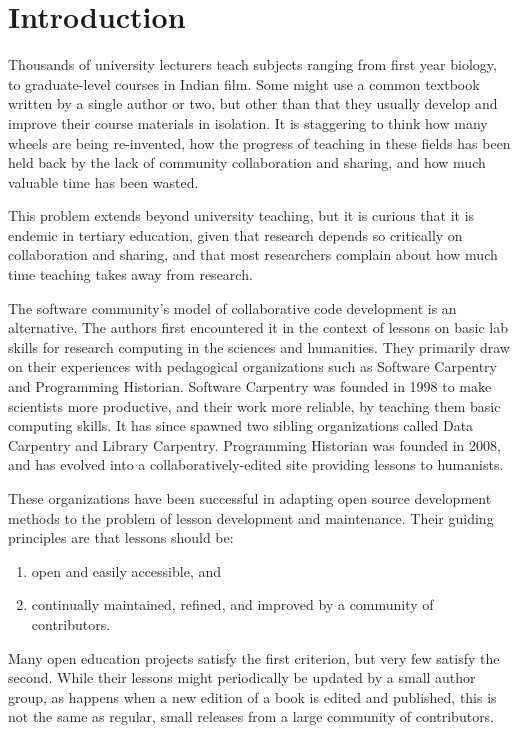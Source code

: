\documentclass[10pt,letterpaper]{article}
\begin{document}
\section*{Introduction}

Thousands of university lecturers teach subjects ranging from first year biology,
to graduate-level courses in Indian film.
Some might use a common textbook written by a single author or two,
but other than that they usually develop and improve their course materials in isolation.
It is staggering to think how many wheels are being re-invented,
how the progress of teaching in these fields has been held back by
the lack of community collaboration and sharing,
and how much valuable time has been wasted.

This problem extends beyond university teaching,
but it is curious that it is endemic in tertiary education,
given that research depends so critically on collaboration and sharing,
and that most researchers complain about how much time teaching takes away from research.

The software community's model of collaborative code development is an alternative.
The authors first encountered it in the context of
lessons on basic lab skills for research computing
in the sciences and humanities. They primarily draw on
their experiences with pedagogical organizations such as
Software Carpentry and Programming Historian.
Software Carpentry was founded in 1998
to make scientists more productive,
and their work more reliable,
by teaching them basic computing skills.
It has since spawned two sibling organizations called Data Carpentry and Library Carpentry.
Programming Historian was founded in 2008,
and has evolved into a collaboratively-edited site providing lessons to humanists.

These organizations have been successful in adapting open source development methods
to the problem of lesson development and maintenance.
Their guiding principles are that lessons should be:

\begin{enumerate}

\item
  open and easily accessible, and

\item
  continually maintained, refined, and improved
  by a community of contributors.

\end{enumerate}

Many open education projects satisfy the first criterion,
but very few satisfy the second.
While their lessons might periodically be updated by a small author group,
as happens when a new edition of a book is edited and published,
this is not the same as regular, small releases
from a large community of contributors.
\end{document}
